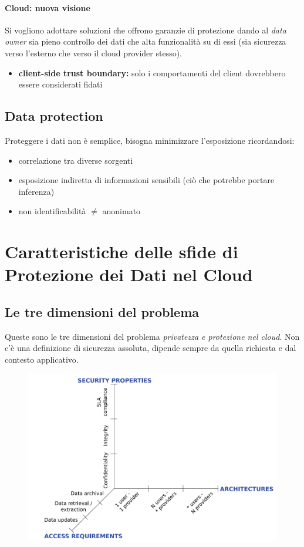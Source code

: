 \documentclass{report}
\begin{document}
\subsubsection{Cloud: nuova visione}
Si vogliono adottare soluzioni che offrono garanzie di protezione dando al \textit{data owner} sia pieno controllo dei dati che alta funzionalità su di essi (sia 
sicurezza verso l'esterno che verso il cloud provider stesso).
\begin{itemize}
    \item \textbf{client-side trust boundary:} solo i comportamenti del client dovrebbero essere considerati fidati
\end{itemize}


\section{Data protection}
Proteggere i dati non è semplice, bisogna minimizzare l'esposizione ricordandosi:
\begin{itemize}
    \item correlazione tra diverse sorgenti
    \item esposizione indiretta di informazioni sensibili (ciò che potrebbe portare inferenza)
    \item non identificabilità $ \neq $ anonimato
\end{itemize}

\chapter{Caratteristiche delle sfide di Protezione dei Dati nel Cloud}
\section{Le tre dimensioni del problema}
Queste sono le tre dimensioni del problema \textit{privatezza e protezione nel cloud}.
Non c'è una definizione di sicurezza assoluta, dipende sempre da quella richiesta e dal contesto applicativo.
\begin{figure}[ht]
    \centering
    \includegraphics[width=1\linewidth]{images/3 dimensioni.png}
\end{figure}
\end{document}
